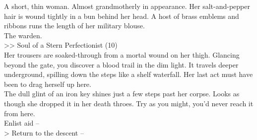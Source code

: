 A short, thin woman. Almost grandmotherly in appearance. Her salt-and-pepper hair is wound tightly in a bun behind her head. A host of brass emblems and ribbons runs the length of her military blouse.\\

The warden.\\
>> Soul of a Stern Perfectionist (10)\\

Her trousers are soaked-through from a mortal wound on her thigh. Glancing beyond the gate, you discover a blood trail in the dim light. It travels deeper underground, spilling down the steps like a shelf waterfall. Her last act must have been to drag herself up here.\\

The dull glint of an iron key shines just a few steps past her corpse. Looks as though she dropped it in her death throes. Try as you might, you’d never reach it from here.\\

 Enlist aid -- \\
> Return to the descent -- 